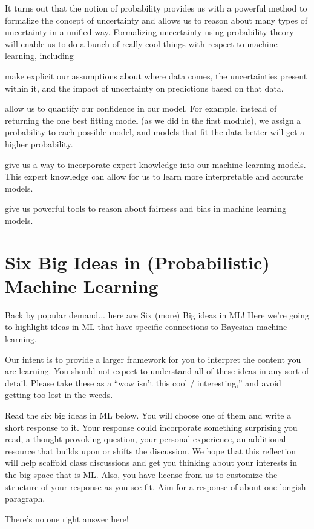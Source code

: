 \documentclass[assignment01_Solutions]{subfiles}
\begin{document}
It turns out that the notion of probability provides us with a powerful method to formalize the concept of uncertainty and allows us to reason about many types of uncertainty in a unified way.  Formalizing uncertainty using probability theory will enable us to do a bunch of really cool things with respect to machine learning, including

\bi
\item make explicit our assumptions about where data comes, the uncertainties present within it, and the impact of uncertainty on predictions based on that data.
\item allow us to quantify our confidence in our model.  For example, instead of returning the one best fitting model (as we did in the first module), we assign a probability to each possible model, and models that fit the data better will get a higher probability.
\item give us a way to incorporate expert knowledge into our machine learning models.  This expert knowledge can allow for us to learn more interpretable and accurate models.
\item give us powerful tools to reason about fairness and bias in machine learning models.
\ei

\section{Six Big Ideas in (Probabilistic) Machine Learning}
Back by popular demand... here are Six (more) Big ideas in ML!  Here we're going to highlight ideas in ML that have specific connections to Bayesian machine learning.

\begin{notice}
Our intent is to provide a larger framework for you to interpret the content you are learning.  You should not expect to understand all of these ideas in any sort of detail.  Please take these as a ``wow isn't this cool / interesting,'' and avoid getting too lost in the weeds.
\end{notice}


\begin{exercise}
Read the six big ideas in ML below.  You will choose one of them and write a short response to it.  Your response could incorporate something surprising you read, a thought-provoking question, your personal experience, an additional resource that builds upon or shifts the discussion.  We hope that this reflection will help scaffold class discussions and get you thinking about your interests in the big space that is ML.  Also, you have license from us to customize the structure of your response as you see fit.  Aim for a response of about one longish paragraph.

\begin{boxedsolution}
There's no one right answer here!
\end{boxedsolution}
\end{exercise}
\end{document}
